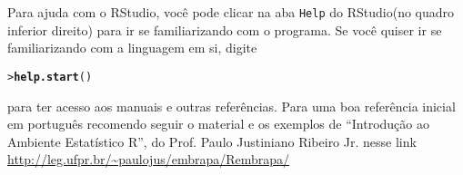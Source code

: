 \documentclass[a4paper,12pt]{article}\usepackage{graphicx, color}
\makeatletter
\newcommand{\hlfunctioncall}[1]{\textcolor[rgb]{0,0,0.545098039215686}{\textbf{#1}}}%
\newenvironment{kframe}{%
 \def\at@end@of@kframe{}%
 \ifinner\ifhmode%
  \def\at@end@of@kframe{\end{minipage}}%
  \begin{minipage}{\columnwidth}%
 \fi\fi%
 \def\FrameCommand##1{\hskip\@totalleftmargin \hskip-\fboxsep
 \colorbox{shadecolor}{##1}\hskip-\fboxsep
     \hskip-\linewidth \hskip-\@totalleftmargin \hskip\columnwidth}%
 \MakeFramed {\advance\hsize-\width
   \@totalleftmargin\z@ \linewidth\hsize
   \@setminipage}}%
 {\par\unskip\endMakeFramed%
 \at@end@of@kframe}
\newenvironment{knitrout}{}{} %
\providecommand{\R}{\textsf{R}\xspace}
\providecommand{\RStudio}{\textsf{RStudio}\xspace}
\makeatother
\begin{document}
Para ajuda com o \RStudio, você pode clicar na aba \texttt{Help} do
\RStudio (no quadro inferior direito) para ir se familiarizando com o
programa. Se você quiser ir se familiarizando com a linguagem em si,
digite
\begin{knitrout}\small
{}\color{fgcolor}\begin{kframe}
\begin{alltt}
 > \hlfunctioncall{help.start}()
\end{alltt}
\end{kframe}
\end{knitrout}

\noindent para ter acesso aos manuais e outras referências. Para uma boa
referência inicial em português recomendo seguir o material e os
exemplos de ``Introdução ao Ambiente Estatístico R'', do Prof. Paulo
Justiniano Ribeiro Jr. nesse link
\url{http://leg.ufpr.br/~paulojus/embrapa/Rembrapa/}





\end{document}
